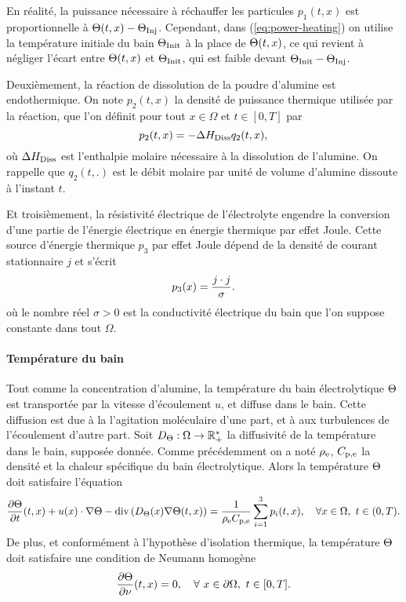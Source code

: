 \begin{remarque}
  En réalité, la puissance nécessaire à réchauffer les particules
  $p_1(t, x)$ est proportionnelle à ${\Theta(t, x) -
    \Theta_\text{Inj}}$. Cependant, dans (\ref{eq:power-heating}) on utilise la
  température initiale du bain $\Theta_\text{Init}$ à la place de
  $\Theta(t, x)$, ce qui revient à négliger l'écart entre
  $\Theta(t, x)$ et $\Theta_\text{Init}$, qui est faible devant ${\Theta_\text{Init} -
  \Theta_\text{Inj}}$.
\end{remarque}

Deuxièmement, la réaction de dissolution de la poudre d'alumine est
endothermique. On note $p_2(t, x)$ la densité de puissance thermique
utilisée par la réaction, que l'on définit pour tout $x\in\Omega$ et
$t\in[0, T]$ par
\begin{equation}\label{eq:p2}
p_2(t, x) = - \Delta H_\text{Diss} q_2(t, x),
\end{equation}
où $\Delta H_\text{Diss}$ est l'enthalpie molaire nécessaire à
la dissolution de l'alumine. On rappelle que $q_2(t, .)$ est le
débit molaire par unité de volume d'alumine dissoute à l'instant $t$.

Et troisièmement, la résistivité électrique de l'électrolyte engendre
la conversion d'une partie de l'énergie électrique en énergie
thermique par effet Joule. Cette source d'énergie thermique $p_3$ par
effet Joule dépend de la densité de courant stationnaire $j$ et
s'écrit
\begin{equation}\label{eq:p3}
p_3(x) = \frac{j\cdot j}{\sigma}.
\end{equation}
où le nombre réel $\sigma > 0$ est la conductivité électrique du bain que l'on
suppose constante dans tout $\Omega$.

\paragraph{Température du bain}
Tout comme la concentration d'alumine, la température du bain
électrolytique $\Theta$ est transportée par la vitesse
d'écoulement $u$, et diffuse dans le bain. Cette diffusion est due à
la l'agitation moléculaire d'une part, et à aux turbulences de
l'écoulement d'autre part. Soit $D_\Theta:\Omega\to\mathbb
R^*_+$ la diffusivité de la température dans le bain, supposée
donnée. Comme précédemment on a noté $\rho_\mathrm{e}$,
$C_{\mathrm{p,e}}$ la densité et la chaleur spécifique du bain
électrolytique. Alors la température $\Theta$ doit satisfaire
l'équation
\begin{equation}\label{eq:temperature}
\frac{\partial \Theta}{\partial t}(t, x) +
u(x)\cdot\nabla\Theta - \mathrm{div}\left( D_\Theta(x)\nabla
\Theta(t, x) \right) =
\frac{1}{\rho_\mathrm{e}C_{\mathrm{p,e}}}\sum_{i = 1}^{3}p_i(t, x),
\quad \forall x\in\Omega,\ t\in(0, T).
\end{equation}
De plus, et conformément à l'hypothèse d'isolation thermique, la température
$\Theta$ doit satisfaire une condition de Neumann homogène
\begin{equation}\label{eq:t-bc}
  \frac{\partial \Theta}{\partial \nu}(t, x) = 0, \quad
  \forall\ x\in\partial \Omega,\ t\in[0, T].
\end{equation}

